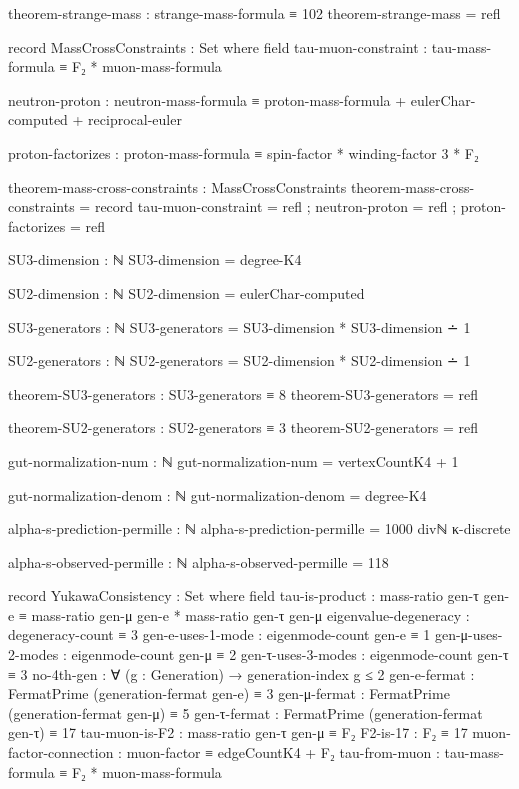 \documentclass[11pt,a4paper]{book}
\begin{document}
\begin{code}
theorem-strange-mass : strange-mass-formula ≡ 102
theorem-strange-mass = refl

record MassCrossConstraints : Set where
  field
    tau-muon-constraint    : tau-mass-formula ≡ F₂ * muon-mass-formula
    
    neutron-proton    : neutron-mass-formula ≡ proton-mass-formula + eulerChar-computed + reciprocal-euler
    
    proton-factorizes : proton-mass-formula ≡ spin-factor * winding-factor 3 * F₂

theorem-mass-cross-constraints : MassCrossConstraints
theorem-mass-cross-constraints = record
  { tau-muon-constraint    = refl
  ; neutron-proton    = refl
  ; proton-factorizes = refl
  }

SU3-dimension : ℕ
SU3-dimension = degree-K4

SU2-dimension : ℕ
SU2-dimension = eulerChar-computed


SU3-generators : ℕ
SU3-generators = SU3-dimension * SU3-dimension ∸ 1

SU2-generators : ℕ
SU2-generators = SU2-dimension * SU2-dimension ∸ 1



theorem-SU3-generators : SU3-generators ≡ 8
theorem-SU3-generators = refl

theorem-SU2-generators : SU2-generators ≡ 3
theorem-SU2-generators = refl

gut-normalization-num : ℕ
gut-normalization-num = vertexCountK4 + 1

gut-normalization-denom : ℕ
gut-normalization-denom = degree-K4



alpha-s-prediction-permille : ℕ
alpha-s-prediction-permille = 1000 divℕ κ-discrete

alpha-s-observed-permille : ℕ
alpha-s-observed-permille = 118


record YukawaConsistency : Set where
  field
    tau-is-product : mass-ratio gen-τ gen-e ≡ 
                     mass-ratio gen-μ gen-e * mass-ratio gen-τ gen-μ
    eigenvalue-degeneracy : degeneracy-count ≡ 3
    gen-e-uses-1-mode : eigenmode-count gen-e ≡ 1
    gen-μ-uses-2-modes : eigenmode-count gen-μ ≡ 2
    gen-τ-uses-3-modes : eigenmode-count gen-τ ≡ 3
    no-4th-gen : ∀ (g : Generation) → generation-index g ≤ 2
    gen-e-fermat : FermatPrime (generation-fermat gen-e) ≡ 3
    gen-μ-fermat : FermatPrime (generation-fermat gen-μ) ≡ 5
    gen-τ-fermat : FermatPrime (generation-fermat gen-τ) ≡ 17
    tau-muon-is-F2 : mass-ratio gen-τ gen-μ ≡ F₂
    F2-is-17 : F₂ ≡ 17
    muon-factor-connection : muon-factor ≡ edgeCountK4 + F₂
    tau-from-muon : tau-mass-formula ≡ F₂ * muon-mass-formula


\end{code}
\end{document}
